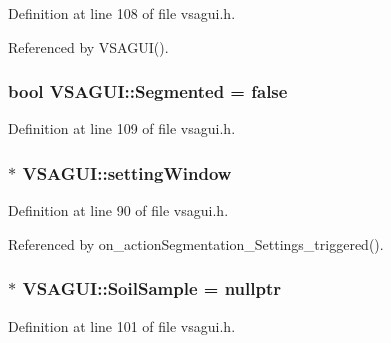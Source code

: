 Definition at line 108 of file vsagui.\+h.



Referenced by V\+S\+A\+G\+U\+I().

\hypertarget{class_v_s_a_g_u_i_a7684dfb6ffa5e169d611f2070b8e5041}{}
\subsubsection[{Segmented}]{\setlength{\rightskip}{0pt plus 5cm}bool V\+S\+A\+G\+U\+I\+::\+Segmented = false\hspace{0.3cm}{\ttfamily [private]}}\label{class_v_s_a_g_u_i_a7684dfb6ffa5e169d611f2070b8e5041}


Definition at line 109 of file vsagui.\+h.

\hypertarget{class_v_s_a_g_u_i_a76c2e60393e9a3d61bcc22fd02b80b87}{}
\subsubsection[{setting\+Window}]{$\ast$ V\+S\+A\+G\+U\+I\+::setting\+Window\hspace{0.3cm}{\ttfamily [private]}}\label{class_v_s_a_g_u_i_a76c2e60393e9a3d61bcc22fd02b80b87}


Definition at line 90 of file vsagui.\+h.



Referenced by on\+\_\+action\+Segmentation\+\_\+\+Settings\+\_\+triggered().

\hypertarget{class_v_s_a_g_u_i_ac90517c9baea0a75455d43d5eb77d3e7}{}
\subsubsection[{Soil\+Sample}]{$\ast$ V\+S\+A\+G\+U\+I\+::\+Soil\+Sample = nullptr\hspace{0.3cm}{\ttfamily [private]}}\label{class_v_s_a_g_u_i_ac90517c9baea0a75455d43d5eb77d3e7}


Definition at line 101 of file vsagui.\+h.



